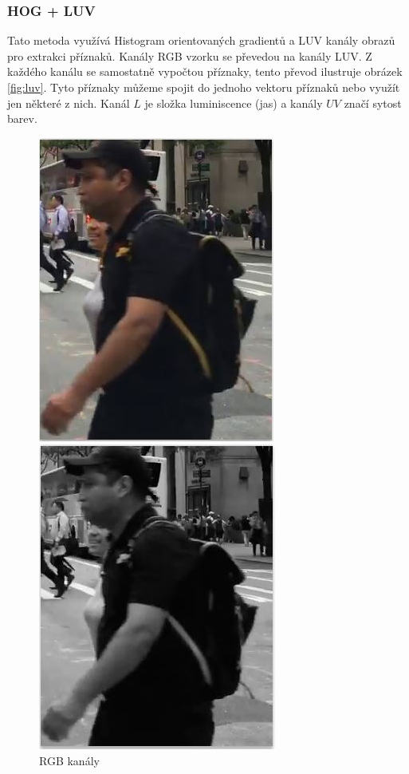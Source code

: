 \subsubsection*{HOG + LUV}
Tato metoda využívá Histogram orientovaných gradientů a LUV kanály obrazů pro extrakci příznaků. Kanály RGB vzorku se převedou na kanály LUV. Z každého kanálu se samostatně vypočtou příznaky, tento převod ilustruje obrázek \ref{fig:luv}. Tyto příznaky můžeme spojit do jednoho vektoru příznaků nebo využít jen některé z nich. Kanál $L$ je složka luminiscence (jas) a kanály $UV$ značí sytost barev. 

\begin{figure}[H]
\centering
\begin{minipage}[b]{.3\textwidth}
  \centering
  \includegraphics[width=.7\linewidth]{figures/rgb_luv}
  \caption*{RGB kanály}
\end{minipage}%
\begin{minipage}[b]{.3\textwidth}
  \centering
  \includegraphics[width=.7\linewidth]{figures/luma}

\end{minipage}
\end{figure}
